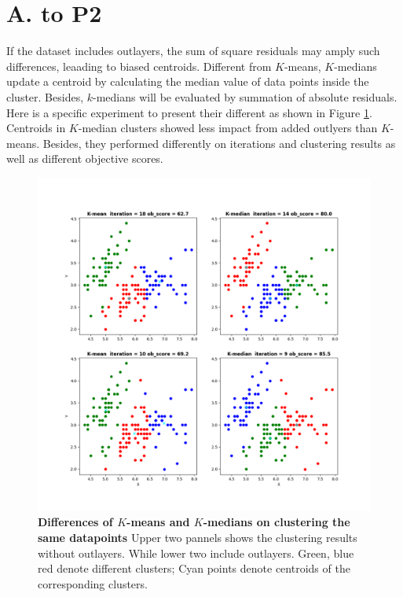\documentclass[11pt]{article}
\newcommand{\mfile}[1]  {{\small }} %
\begin{document}
	\section*{A. to P2}
	If the dataset includes outlayers, the sum of square residuals may amply such differences, leaading to biased centroids. Different from $K$-means, $K$-medians update a centroid by calculating the median value of data points inside the cluster. Besides, $k$-medians will be evaluated by summation of absolute residuals. Here is a specific experiment to present their different as shown in Figure \ref{fig:p1}. Centroids in $K$-median clusters showed less impact from added outlyers than $K$-means. Besides, they performed differently on iterations and clustering results as well as different objective scores. 
	\begin{figure}
		\centering\includegraphics[width=.75\linewidth]{prob2.png}
		\caption{\textbf{Differences of $K$-means and $K$-medians on clustering the same datapoints} Upper two pannels shows the clustering results without outlayers. While lower two include outlayers. Green, blue red denote different clusters; Cyan points denote centroids of the corresponding clusters. } %
		\label{fig:p1}  %
	\end{figure}
	\mfile{class_used_prob2.py}
\end{document}

